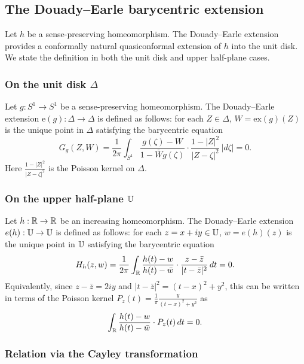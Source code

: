 \subsection{The Douady--Earle barycentric extension}\label{ss:de}

Let $h$ be a sense-preserving homeomorphism. The Douady--Earle extension \cite{DE} provides a conformally natural quasiconformal extension of $h$ into the unit disk. We state the definition in both the unit disk and upper half-plane cases.

\subsubsection*{\texorpdfstring{On the unit disk $\Delta$}{On the unit disk}}

Let $g: S^1 \to S^1$ be a sense-preserving homeomorphism. The Douady--Earle extension $\mathrm{e}(g): \Delta \to \Delta$ is defined as follows: for each $Z \in \Delta$, $W = \mathrm{ex}(g)(Z)$ is the unique point in $\Delta$ satisfying the barycentric equation
\[
G_g(Z, W) = \frac{1}{2\pi}\int_{S^1} \frac{g(\zeta) - W}{1 - \bar{W}g(\zeta)} \cdot \frac{1 - |Z|^2}{|Z - \zeta|^2}\,|d\zeta| = 0.
\]
Here $\frac{1-|Z|^2}{|Z-\zeta|^2}$ is the Poisson kernel on $\Delta$.

\subsubsection*{\texorpdfstring{On the upper half-plane $\mathbb{U}$}{On the upper half-plane}}

Let $h: \mathbb{R} \to \mathbb{R}$ be an increasing homeomorphism. The Douady--Earle extension $e(h): \mathbb{U} \to \mathbb{U}$ is defined as follows: for each $z = x + iy \in \mathbb{U}$, $w = e(h)(z)$ is the unique point in $\mathbb{U}$ satisfying the barycentric equation
\[
H_h(z, w) = \frac{1}{2\pi}\int_{\mathbb{R}} \frac{h(t) - w}{h(t) - \bar{w}} \cdot \frac{z - \bar{z}}{|t - \bar{z}|^2}\,dt = 0.
\]
Equivalently, since $z - \bar{z} = 2iy$ and $|t - \bar{z}|^2 = (t-x)^2 + y^2$, this can be written in terms of the Poisson kernel $P_z(t) = \frac{1}{\pi}\frac{y}{(t-x)^2 + y^2}$ as
\[
\int_{\mathbb{R}} \frac{h(t) - w}{h(t) - \bar{w}} \cdot P_z(t)\,dt = 0.
\]

\subsubsection*{Relation via the Cayley transformation}

